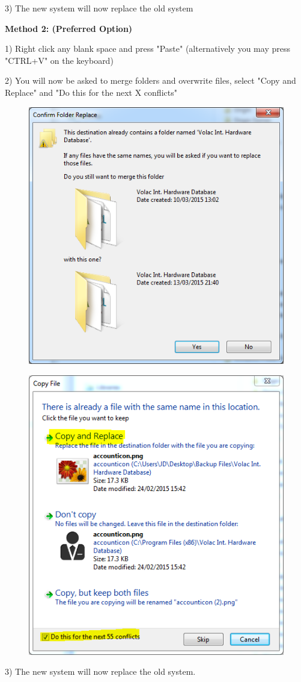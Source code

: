 3) The new system will now replace the old system

\textbf{Method 2: (Preferred Option)}

1) Right click any blank space and press "Paste" (alternatively you may press "CTRL+V" on the keyboard)

2) You will now be asked to merge folders and overwrite files, select "Copy and Replace" and "Do this for the next X conflicts"

\begin{figure}[H]
    \includegraphics[width=\textwidth]{./Manual/Images/restore3.png}
\end{figure}

\begin{figure}[H]
    \includegraphics[width=\textwidth]{./Manual/Images/restore4.png}
\end{figure}

3) The new system will now replace the old system. 

\stopcontents[chapters]